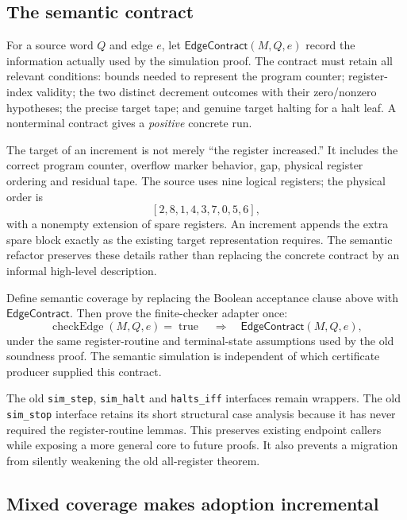 \documentclass[11pt]{article}
\newcommand{\code}[1]{\texttt{\small #1}}
\begin{document}
\subsection{The semantic contract}

For a source word $Q$ and edge $e$, let $\mathsf{EdgeContract}(M,Q,e)$ record the information actually used by the simulation proof. The contract must retain all relevant conditions: bounds needed to represent the program counter; register-index validity; the two distinct decrement outcomes with their zero/nonzero hypotheses; the precise target tape; and genuine target halting for a halt leaf. A nonterminal contract gives a \emph{positive} concrete run.

The target of an increment is not merely ``the register increased.'' It includes the correct program counter, overflow marker behavior, gap, physical register ordering and residual tape. The source uses nine logical registers; the physical order is
\[
 [2,8,1,4,3,7,0,5,6],
\]
with a nonempty extension of spare registers. An increment appends the extra spare block exactly as the existing target representation requires. The semantic refactor preserves these details rather than replacing the concrete contract by an informal high-level description.

Define semantic coverage by replacing the Boolean acceptance clause above with $\mathsf{EdgeContract}$. Then prove the finite-checker adapter once:
\[
 \operatorname{checkEdge}(M,Q,e)=\operatorname{true}
 \quad\Longrightarrow\quad
 \mathsf{EdgeContract}(M,Q,e),
\]
under the same register-routine and terminal-state assumptions used by the old soundness proof. The semantic simulation is independent of which certificate producer supplied this contract.

The old \code{sim\_step}, \code{sim\_halt} and \code{halts\_iff} interfaces remain wrappers. The old \code{sim\_stop} interface retains its short structural case analysis because it has never required the register-routine lemmas. This preserves existing endpoint callers while exposing a more general core to future proofs. It also prevents a migration from silently weakening the old all-register theorem.

\subsection{Mixed coverage makes adoption incremental}
\end{document}
